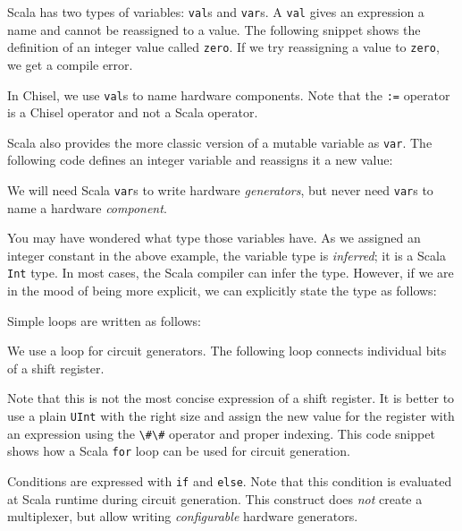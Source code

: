 \documentclass[%
    10pt,
    headinclude, footinclude=false,
    openright, %
    notitlepage,
    cleardoublepage=empty,
    headsepline,
    numbers=noenddot,
    bibliography=totoc, index=totoc,
    ]{scrbook}
\newcommand{\code}[1]{{\lstinline[basicstyle=\small\ttfamily]{#1}}}
\begin{document}
Scala has two types of variables: \code{val}s and \code{var}s. A \code{val} gives an expression
a name and cannot be reassigned to a value. The following snippet shows the definition of
an integer value called \code{zero}. If we try reassigning a value to \code{zero}, we get
a compile error.


\noindent In Chisel, we use \code{val}s to name hardware components. Note that the \code{:=}
operator is a Chisel operator and not a Scala operator.

Scala also provides the more classic version of a mutable variable as \code{var}. The following code defines
an integer variable and reassigns it a new value:


\noindent We will need Scala \code{var}s to write hardware \emph{generators}, but never need
\code{var}s to name a hardware \emph{component}.

You may have wondered what type those variables have. As we assigned an integer constant
in the above example, the variable type is \emph{inferred}; it is a Scala \code{Int} type.
In most cases, the Scala compiler can infer the type. However, if we are in the mood of
being more explicit, we can explicitly state the type as follows:


Simple loops are written as follows:


We use a loop for circuit generators. The following loop connects individual bits
of a shift register.


\noindent Note that this is not the most concise expression of a shift register.
It is better to use a plain \code{UInt} with the right size and assign the new value for the
register with an expression using the \code{\#\#} operator
and proper indexing. This code snippet shows how a Scala \code{for} loop can be used
for circuit generation.

Conditions are expressed with \code{if} and \code{else}. Note that this condition
is evaluated at Scala runtime during circuit generation. This construct does \emph{not}
create a multiplexer, but allow writing \emph{configurable} hardware generators.

\end{document}
